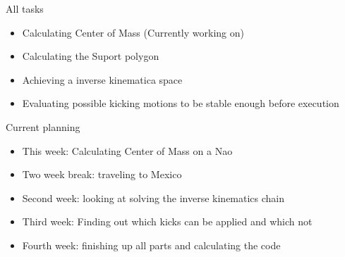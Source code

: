 \documentclass{beamer}
\begin{document}
\begin{frame}{All tasks}
    \begin{itemize}
        \item{Calculating Center of Mass (Currently working on)}
        \item{Calculating the Suport polygon}
        \item{Achieving a inverse kinematica space}
        \item{Evaluating possible kicking motions to be stable enough before
            execution}
    \end{itemize}
\end{frame}

\begin{frame}{Current planning}
    \begin{itemize}
    \item{This week: Calculating Center of Mass on a Nao}
    \item{Two week break: traveling to Mexico}
    \item{Second week: looking at solving the inverse kinematics chain}
    \item{Third week: Finding out which kicks can be applied and which not }
    \item{Fourth week: finishing up all parts and calculating the code} 
    \end{itemize}
\end{frame}
\end{document}
